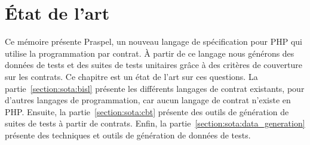 \chapter{État de l'art}
\label{chapter:state}

\mminitoc

Ce mémoire présente Praspel, un nouveau langage de spécification pour PHP qui
utilise la programmation par contrat. À partir de ce langage nous générons des
données de tests et des suites de tests unitaires grâce à des critères de
couverture sur les contrats. Ce chapitre est un état de l'art sur ces questions.
La partie~\ref{section:sota:bisl} présente les différents langages de contrat
existants, pour d'autres langages de programmation, car aucun langage de contrat
n'existe en PHP. Ensuite, la partie~\ref{section:sota:cbt} présente des outils
de génération de suites de tests à partir de contrats. Enfin, la
partie~\ref{section:sota:data_generation} présente des techniques et outils de
génération de données de tests.

